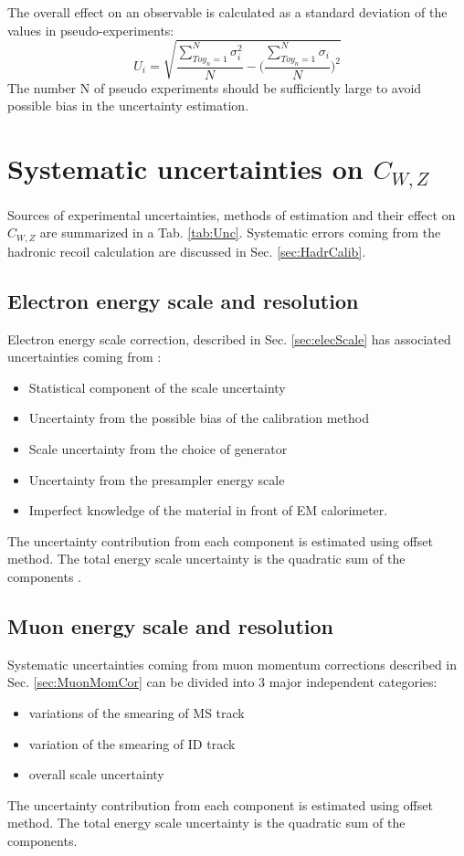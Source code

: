 The overall effect on an observable is calculated as a standard deviation of the values in pseudo-experiments:
\begin{equation}\label{eq:ToyError}
U_{i}=\sqrt{\frac{\sum_{Toy_n=1}^{N} \sigma^2_{i}} {N} - \Bigg(\frac{\sum_{Toy_n=1}^{N} \sigma_{i}} {N}\Bigg)^2}
\end{equation}
The number N of pseudo experiments should be sufficiently large to avoid possible bias in the uncertainty estimation.
 
\section{Systematic uncertainties on $C_{W,Z}$}\label{sec:cwErr}
Sources of experimental uncertainties, methods of estimation and their effect on $C_{W,Z}$ are summarized in a Tab. \ref{tab:Unc}. Systematic errors coming from the hadronic recoil calculation are discussed in Sec. \ref{sec:HadrCalib}. 
\subsection{Electron energy scale and resolution}
Electron energy scale correction, described in Sec. \ref{sec:elecScale} has associated uncertainties coming from \cite{1110.3174}:
\begin{itemize}
\item Statistical component of the scale uncertainty
\item Uncertainty from the possible bias of the calibration method
\item Scale uncertainty from the choice of generator
\item Uncertainty from the presampler energy scale
\item Imperfect knowledge of the material in front of EM calorimeter.
\end{itemize}
The uncertainty contribution from each component is estimated using offset method. The total energy scale uncertainty is the quadratic sum of the components \cite{ElecUncQuad}. 

\subsection{Muon energy scale and resolution}
Systematic uncertainties coming from muon momentum corrections described in Sec. \ref{sec:MuonMomCor} can be divided into 3 major independent categories:
\begin{itemize}
\item variations of the smearing of MS track
\item variation of the smearing of ID track
\item overall scale uncertainty
\end{itemize}
The uncertainty contribution from each component is estimated using offset method. The total energy scale uncertainty is the quadratic sum of the components.

